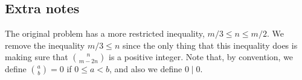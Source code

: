 \documentclass{article}
\begin{document}
\subsection*{Extra notes}

The original problem has a more restricted inequality, $m/3 \leq n \leq m/2$.
We remove the inequality $m/3 \leq n$ since the only thing that this inequality does is making sure that ${n \choose m - 2n}$ is a positive integer.
Note that, by convention, we define ${a \choose b} = 0$ if $0 \leq a < b$, and also we define $0 \mid 0$.
\end{document}
